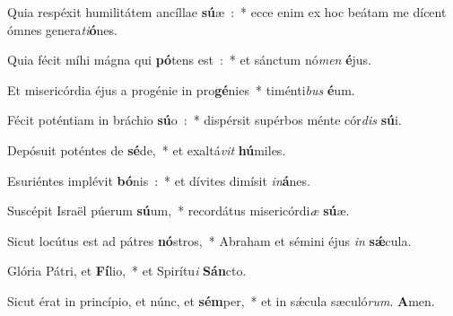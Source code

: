 ﻿\item Quia respéxit humilitátem ancíllae \textbf{sú}\-æ~:~* ecce enim ex hoc beátam me dícent ómnes genera\emph{ti}\textbf{ó}nes.
\item Quia fécit míhi mágna qui \textbf{pó}\-tens est~:~* et sánctum nó\emph{men} \textbf{é}jus.
\item Et misericórdia éjus a progénie in pro\textbf{gé}\-nies~* timénti\emph{bus} \textbf{é}um.
\item Fécit poténtiam in bráchio \textbf{sú}\-o~:~* dispérsit supérbos ménte cór\emph{dis} \textbf{sú}i.
\item Depósuit poténtes de \textbf{sé}\-de,~* et exaltá\emph{vit} \textbf{hú}miles.
\item Esuriéntes implévit \textbf{bó}\-nis~:~* et dívites dimísit \emph{in}\textbf{á}nes.
\item Suscépit Israël púerum \textbf{sú}\-um,~* recordátus misericórdi\emph{æ} \textbf{sú}æ.
\item Sicut locútus est ad pátres \textbf{nó}\-stros,~* Abraham et sémini éjus \emph{in} \textbf{sǽ}cula.
\item Glória Pátri, et \textbf{Fí}\-lio,~* et Spirítu\emph{i} \textbf{Sán}cto.
\item Sicut érat in princípio, et núnc, et \textbf{sém}\-per,~* et in sǽcula sæculó\emph{rum}. \textbf{A}men.